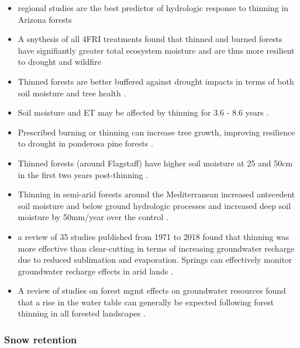 \documentclass[
  number]{elsarticle}
\begin{document}
\begin{itemize}
\item
  regional studies are the best predictor of hydrologic response to
  thinning in Arizona forests \citep{wyatt_estimating_2013}
\item
  A snythesis of all 4FRI treatments found that thinned and burned
  forests have signifiantly greater total ecosystem moisture and are
  thus more resilient to drought and wildfire
  \citep{sankey_regionalscale_2021}
\item
  Thinned forests are better buffered against drought impacts in terms
  of both soil moisture and tree health \citep{sankey_thinning_2022}.
\item
  Soil moisture and ET may be affected by thinning for 3.6 - 8.6 years
  \citep{del_campo_global_2022}.
\item
  Prescribed burning or thinning can increase tree growth, improving
  resilience to drought in ponderosa pine forests \citep{rodman2024}.
\item
  Thinned forests (around Flagstaff) have higher soil moisture at 25 and
  50cm in the first two years post-thinning \citep{belmonte_soil_2022}.
\item
  Thinning in semi-arid forests around the Mediterranean increased
  antecedent soil moisture and below ground hydrologic processes and
  increased deep soil moisture by 50mm/year over the control
  \citep{del_campo_effectiveness_2019}.
\item
  a review of 35 studies published from 1971 to 2018 found that thinning
  was more effective than clear-cutting in terms of increasing
  groundwater recharge due to reduced sublimation and evaporation.
  Springs can effectively monitor groundwater recharge effects in arid
  lands \citep{schenk_impacts_2020}.
\item
  A review of studies on forest mgmt effects on groundwater resources
  found that a rise in the water table can generally be expected
  following forest thinning in all forested landscapes
  \citep{smerdon_overview_2009}.
\end{itemize}

\subsubsection{Snow retention}\label{snow-retention}
\end{document}
